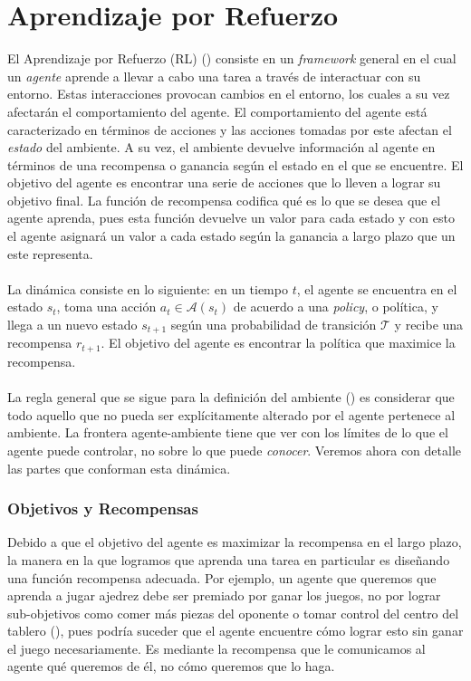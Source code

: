 \documentclass[11pt]{article}
\theoremstyle{plain}
\begin{document}
\section{Aprendizaje por Refuerzo}
El Aprendizaje por Refuerzo (RL) (\cite{sutton1998reinforcement}) consiste en un \textit{framework} general en el cual un \textit{agente} aprende a llevar a cabo una tarea a través de interactuar con su entorno. Estas interacciones provocan cambios en el entorno, los cuales a su vez afectarán el comportamiento del agente. El comportamiento del agente está caracterizado en términos de acciones y las acciones tomadas por este afectan el \textit{estado} del ambiente. A su vez, el ambiente devuelve información al agente en términos de una recompensa o ganancia según el estado en el que se encuentre. El objetivo del agente es encontrar una serie de acciones que lo lleven a lograr su objetivo final. La función de recompensa codifica qué es lo que se desea que el agente aprenda, pues esta función devuelve un valor para cada estado y con esto el agente asignará un valor a cada estado según la ganancia a largo plazo que un este representa.\\
\\
La dinámica consiste en lo siguiente: en un tiempo $t$, el agente se encuentra en el estado $s_t$, toma una acción $a_t \in \mathcal{A}(s_t)$ de acuerdo a una \textit{policy}, o política, y llega a un nuevo estado $s_{t+1}$ según una probabilidad de transición $\mathcal{T}$ y recibe una recompensa $r_{t+1}$. El objetivo del agente es encontrar la política que maximice la recompensa.\\
\\
La regla general que se sigue para la definición del ambiente (\cite{sutton1998reinforcement}) es considerar que todo aquello que no pueda ser explícitamente alterado por el agente pertenece al ambiente. La frontera agente-ambiente tiene que ver con los límites de lo que el agente puede controlar, no sobre lo que puede \textit{conocer}.
Veremos ahora con detalle las partes que conforman esta dinámica. 
\subsubsection{Objetivos y Recompensas}
Debido a que el objetivo del agente es maximizar la recompensa en el largo plazo, la manera en la que logramos que aprenda una tarea en particular es diseñando una función recompensa adecuada. Por ejemplo, un agente que queremos que aprenda a jugar ajedrez debe ser premiado por ganar los juegos, no por lograr sub-objetivos como comer más piezas del oponente o tomar control del centro del tablero (\cite{sutton1998reinforcement}), pues podría suceder que el agente encuentre cómo lograr esto sin ganar el juego necesariamente. Es mediante la recompensa que le comunicamos al agente qué queremos de él, no cómo queremos que lo haga.
\end{document}
